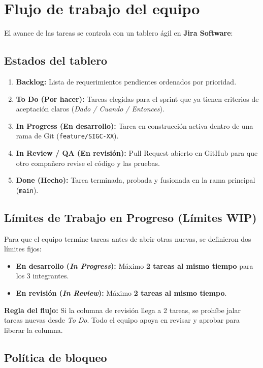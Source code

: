 \section{Flujo de trabajo del equipo}

El avance de las tareas se controla con un tablero ágil en \textbf{Jira Software}:

\subsection{Estados del tablero}

\begin{enumerate}[nosep]
    \item \textbf{Backlog:} Lista de requerimientos pendientes ordenados por prioridad.
    \item \textbf{To Do (Por hacer):} Tareas elegidas para el sprint que ya tienen criterios de aceptación claros (\textit{Dado / Cuando / Entonces}).
    \item \textbf{In Progress (En desarrollo):} Tarea en construcción activa dentro de una rama de Git (\texttt{feature/SIGC-XX}).
    \item \textbf{In Review / QA (En revisión):} Pull Request abierto en GitHub para que otro compañero revise el código y las pruebas.
    \item \textbf{Done (Hecho):} Tarea terminada, probada y fusionada en la rama principal (\texttt{main}).
\end{enumerate}

\subsection{Límites de Trabajo en Progreso (Límites WIP)}

Para que el equipo termine tareas antes de abrir otras nuevas, se definieron dos límites fijos:
\begin{itemize}[nosep]
    \item \textbf{En desarrollo (\textit{In Progress}):} Máximo \textbf{2 tareas al mismo tiempo} para los 3 integrantes.
    \item \textbf{En revisión (\textit{In Review}):} Máximo \textbf{2 tareas al mismo tiempo}.
\end{itemize}
\textbf{Regla del flujo:} Si la columna de revisión llega a 2 tareas, se prohíbe jalar tareas nuevas desde \textit{To Do}. Todo el equipo apoya en revisar y aprobar para liberar la columna.

\subsection{Política de bloqueo}


